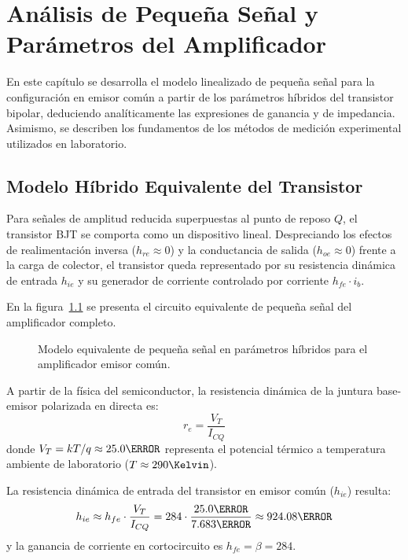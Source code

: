 \chapter{Análisis de Pequeña Señal y Parámetros del Amplificador}
\label{chap:pequena_senal}

En este capítulo se desarrolla el modelo linealizado de pequeña señal para la configuración en emisor común a partir
de los parámetros híbridos del transistor bipolar, deduciendo analíticamente las expresiones de ganancia y de
impedancia. Asimismo, se describen los fundamentos de los métodos de medición experimental utilizados en laboratorio.

\section{Modelo Híbrido Equivalente del Transistor}

Para señales de amplitud reducida superpuestas al punto de reposo $Q$, el transistor BJT se comporta como un
dispositivo lineal. Despreciando los efectos de realimentación inversa ($h_{re} \approx 0$) y la conductancia de
salida ($h_{oe} \approx 0$) frente a la carga de colector, el transistor queda representado por su resistencia
dinámica de entrada $h_{ie}$ y su generador de corriente controlado por corriente $h_{fe} \cdot i_b$.

En la figura~\ref{crkt:pequena_senal} se presenta el circuito equivalente de pequeña señal del amplificador completo.

\begin{figure}[!ht]
  \centering
  
  \caption{Modelo equivalente de pequeña señal en parámetros híbridos para el amplificador emisor común.}
  \label{crkt:pequena_senal}
\end{figure}

A partir de la física del semiconductor, la resistencia dinámica de la juntura base-emisor polarizada en directa es:
\begin{equation}
  r_e = \frac{V_T}{I_{CQ}}
  \label{eq:re_prima}
\end{equation}
donde $V_T = k T / q \approx 25.0\mV$ representa el potencial térmico a temperatura ambiente de laboratorio ($T \approx 290\Kelvin$).

La resistencia dinámica de entrada del transistor en emisor común ($h_{ie}$) resulta:
\begin{equation}
  h_{ie}  \approx h_{fe} \cdot \frac{V_T}{I_{CQ}} = 284 \cdot \frac{25.0\mV}{7.683\mA} \approx 924.08\ohm
  \label{eq:hie_calculo}
\end{equation}
y la ganancia de corriente en cortocircuito es $h_{fe} = \beta = 284$.

